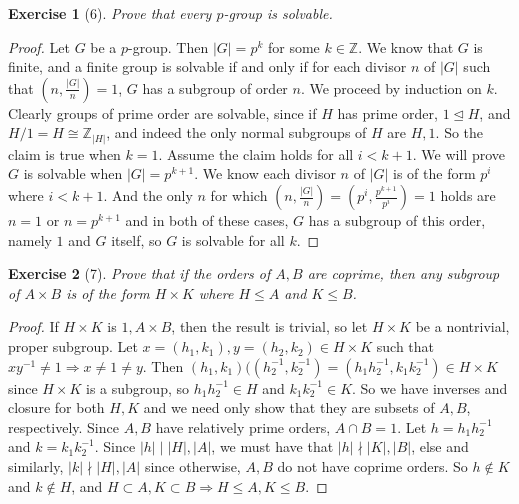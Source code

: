 \documentclass[10pt,oneside,reqno]{amsart}
\theoremstyle{plain}
\newtheorem*{e}{Exercise}
\theoremstyle{definition}
\newcommand{\norm}{\trianglelefteq}
\begin{document}
\begin{e}[6]
Prove that every $p$-group is solvable. 

\end{e}

\begin{proof}
Let $G$ be a $p$-group. Then $|G| = p^k$ for some $k \in \mathbb{Z}$. We know that $G$ is finite, and a finite group is solvable if and only if for each divisor $n$ of $|G|$ such that $(n,\frac{|G|}{n}) = 1$, $G$ has a subgroup of order $n$. We proceed by induction on $k$. Clearly groups of prime order are solvable, since if $H$ has prime order, $1 \norm H$, and $H/1 = H \cong \mathbb{Z}_{|H|}$, and indeed the only normal subgroups of $H$ are $H,1$. So the claim is true when $k = 1$. Assume the claim holds for all $i < {k + 1}$. We will prove $G$ is solvable when  $|G| = p^{k+ 1}$.  We know each divisor $n$ of $|G|$ is of the form $p^i$ where $i < {k + 1}$. And the only $n$ for which $(n,\frac{|G|}{n})  = (p^i,\frac{p^{k  +1}}{p^i}) =1$ holds are $n = 1$ or $n = p^{k  +1}$ and in both of these cases, $G$ has a subgroup of this order, namely $1$ and $G$ itself, so $G$ is solvable for all $k$. 
\end{proof}

\begin{e}[7]
Prove that if the orders of $A,B$ are coprime, then any subgroup of $A \times B$ is of the form $H \times K$ where $H \leq A$ and $K \leq B$. 

\end{e}

\begin{proof}


If $H \times K$ is $1,A \times B$, then the result is trivial, so let $H \times K$ be a nontrivial, proper subgroup. Let $x = (h_1,k_1), y= (h_2,k_2) \in H \times K$ such that $xy^{-1} \neq 1 \Rightarrow x \neq 1 \neq y$. Then $(h_1,k_1)((h_2^{-1},k_2^{-1}) = (h_1h_2^{-1},k_1k_2^{-1}) \in H \times K$ 
since $H \times K$ is a subgroup, so $h_1h_2^{-1} \in H$ and $k_1k_2^{-1} \in K$. So we have inverses and closure for both $H,K$ and we need only show that they are subsets of $A,B$, respectively. Since $A,B$ have relatively prime orders, $A \cap B = 1$. Let $h = h_1h_2^{-1}$ and $k =k_1k_2^{-1}$.  Since $|h| \mid |H|,|A|$, we must have that $|h| \nmid |K|,|B|$, else and similarly, $|k| \nmid |H|,|A|$ since otherwise, $A,B$ do not have coprime orders. So $h \notin K$ and $k \notin H$, and $H \subset A, K \subset B \Rightarrow H \leq A, K \leq B$. \end{proof}
\end{document}
